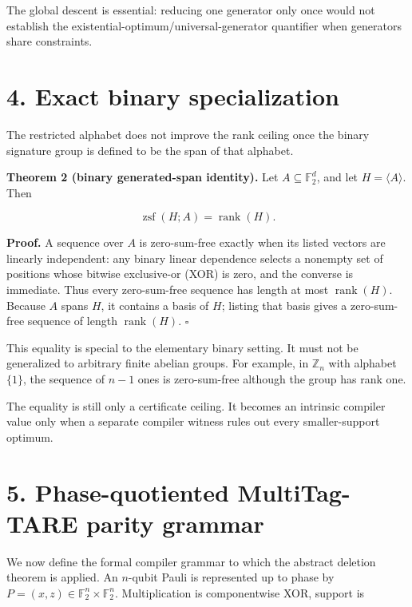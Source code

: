 \documentclass[11pt]{article}
\begin{document}
The global descent is essential: reducing one generator only once would not establish the existential-optimum/universal-generator quantifier when generators share constraints.

\hypertarget{exact-binary-specialization}{%
\section*{4. Exact binary specialization}\label{exact-binary-specialization}}

The restricted alphabet does not improve the rank ceiling once the binary signature group is defined to be the span of that alphabet.

\textbf{Theorem 2 (binary generated-span identity).} Let \(A\subseteq \mathbb{F}_2^d\), and let \(H=\langle A\rangle\). Then

\[
\operatorname{zsf}(H;A)=\operatorname{rank}(H).
\]

\textbf{Proof.} A sequence over \(A\) is zero-sum-free exactly when its listed vectors are linearly independent: any binary linear dependence selects a nonempty set of positions whose bitwise exclusive-or (XOR) is zero, and the converse is immediate. Thus every zero-sum-free sequence has length at most \(\operatorname{rank}(H)\). Because \(A\) spans \(H\), it contains a basis of \(H\); listing that basis gives a zero-sum-free sequence of length \(\operatorname{rank}(H)\). \(\square\)

This equality is special to the elementary binary setting. It must not be generalized to arbitrary finite abelian groups. For example, in \(\mathbb{Z}_n\) with alphabet \(\{1\}\), the sequence of \(n-1\) ones is zero-sum-free although the group has rank one.

The equality is still only a certificate ceiling. It becomes an intrinsic compiler value only when a separate compiler witness rules out every smaller-support optimum.

\hypertarget{phase-quotiented-multitag-tare-parity-grammar}{%
\section*{5. Phase-quotiented MultiTag-TARE parity grammar}\label{phase-quotiented-multitag-tare-parity-grammar}}

We now define the formal compiler grammar to which the abstract deletion theorem is applied. An \(n\)-qubit Pauli is represented up to phase by \(P=(x,z)\in\mathbb{F}_2^n\times\mathbb{F}_2^n\). Multiplication is componentwise XOR, support is
\end{document}
